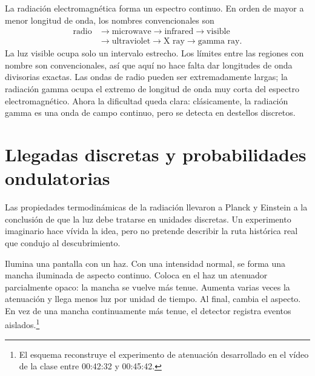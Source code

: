 La radiación electromagnética forma un espectro continuo. En orden de mayor a menor longitud de onda, los nombres convencionales son
\begin{equation}
\begin{aligned}
\text{radio}
&\longrightarrow \text{microwave}
\longrightarrow \text{infrared}
\longrightarrow \text{visible}\\
&\longrightarrow \text{ultraviolet}
\longrightarrow \text{X ray}
\longrightarrow \text{gamma ray}.
\end{aligned}
\end{equation}
La luz visible ocupa solo un intervalo estrecho. Los límites entre las regiones con nombre son convencionales, así que aquí no hace falta dar longitudes de onda divisorias exactas. Las ondas de radio pueden ser extremadamente largas; la radiación gamma ocupa el extremo de longitud de onda muy corta del espectro electromagnético. Ahora la dificultad queda clara: clásicamente, la radiación gamma es una onda de campo continuo, pero se detecta en destellos discretos.

\section{Llegadas discretas y probabilidades ondulatorias}

Las propiedades termodinámicas de la radiación llevaron a Planck y Einstein a la conclusión de que la luz debe tratarse en unidades discretas. Un experimento imaginario hace vívida la idea, pero no pretende describir la ruta histórica real que condujo al descubrimiento.

Ilumina una pantalla con un haz. Con una intensidad normal, se forma una mancha iluminada de aspecto continuo. Coloca en el haz un atenuador parcialmente opaco: la mancha se vuelve más tenue. Aumenta varias veces la atenuación y llega menos luz por unidad de tiempo. Al final, cambia el aspecto. En vez de una mancha continuamente más tenue, el detector registra eventos aislados.\footnote{El esquema reconstruye el experimento de atenuación desarrollado en el vídeo de la clase entre 00:42:32 y 00:45:42.}

